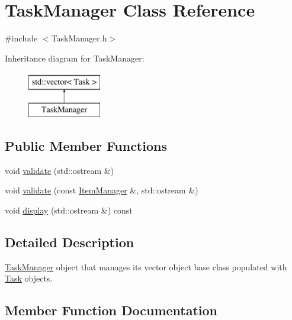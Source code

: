 \hypertarget{classTaskManager}{}\section{Task\+Manager Class Reference}
\label{classTaskManager}


{\ttfamily \#include $<$Task\+Manager.\+h$>$}

Inheritance diagram for Task\+Manager\+:\begin{figure}[H]
\begin{center}
\leavevmode
\includegraphics[height=2.000000cm]{classTaskManager}
\end{center}
\end{figure}
\subsection*{Public Member Functions}
\begin{DoxyCompactItemize}
\item 
void \mbox{\hyperlink{classTaskManager_a2ae3c30ca4e030440b64c383cbda8a73}{validate}} (std\+::ostream \&)
\item 
void \mbox{\hyperlink{classTaskManager_a59aea57b2ad273d6d95797f93d737fa0}{validate}} (const \mbox{\hyperlink{classItemManager}{Item\+Manager}} \&, std\+::ostream \&)
\item 
void \mbox{\hyperlink{classTaskManager_a3564901af8fa7498b0fcca85fcaa5e64}{display}} (std\+::ostream \&) const
\end{DoxyCompactItemize}


\subsection{Detailed Description}
\mbox{\hyperlink{classTaskManager}{Task\+Manager}} object that manages it\textquotesingle{}s vector object base class populated with \mbox{\hyperlink{classTask}{Task}} objects. 

\subsection{Member Function Documentation}
\mbox{\label{classTaskManager_a3564901af8fa7498b0fcca85fcaa5e64}} 
